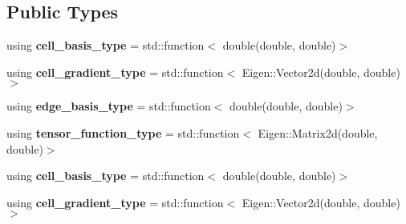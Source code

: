 \subsection*{Public Types}
\begin{DoxyCompactItemize}
\item 
\mbox{\label{classMeshFramework2D_1_1HybridCore_ad46944ac8070f647aa9e785f18aa8383}} 
using {\bfseries cell\+\_\+basis\+\_\+type} = std\+::function$<$ double(double, double)$>$
\item 
\mbox{\label{classMeshFramework2D_1_1HybridCore_a539dd5c964443de7cbce7f2e975d8c3f}} 
using {\bfseries cell\+\_\+gradient\+\_\+type} = std\+::function$<$ Eigen\+::\+Vector2d(double, double)$>$
\item 
\mbox{\label{classMeshFramework2D_1_1HybridCore_abadffa71a4d7f8b48bf9f04fd2211ef7}} 
using {\bfseries edge\+\_\+basis\+\_\+type} = std\+::function$<$ double(double, double)$>$
\item 
\mbox{\label{classMeshFramework2D_1_1HybridCore_a92853eab5ef4260077235e21f477e958}} 
using {\bfseries tensor\+\_\+function\+\_\+type} = std\+::function$<$ Eigen\+::\+Matrix2d(double, double)$>$
\item 
\mbox{\label{classMeshFramework2D_1_1HybridCore_ad46944ac8070f647aa9e785f18aa8383}} 
using {\bfseries cell\+\_\+basis\+\_\+type} = std\+::function$<$ double(double, double)$>$
\item 
\mbox{\label{classMeshFramework2D_1_1HybridCore_a539dd5c964443de7cbce7f2e975d8c3f}} 
using {\bfseries cell\+\_\+gradient\+\_\+type} = std\+::function$<$ Eigen\+::\+Vector2d(double, double)$>$
\end{DoxyCompactItemize}
